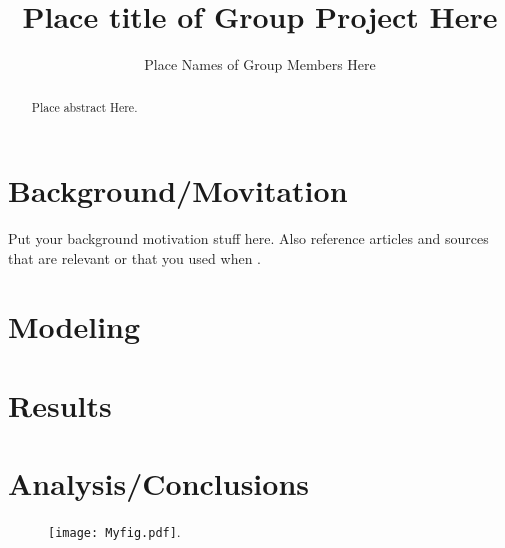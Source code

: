 \documentclass[11pt]{amsart}
\begin{document}
\title{Place title of Group Project Here}
\author{Place Names of Group Members Here}

\date{}

\maketitle

\begin{abstract}
Place abstract Here.
\end{abstract}

\section{Background/Movitation}

Put your background motivation stuff here. Also reference articles and sources that are relevant or that you used when  \cite{Vandermeersch}.

\section{Modeling}



\section{Results}

\section{Analysis/Conclusions}


\begin{figure}[h]
\begin{center} %
\texttt{[image: Myfig.pdf]}. %
\end{center}
\label{fig:MatrixError}
\end{figure}





\FloatBarrier %
\newpage


\end{document}
